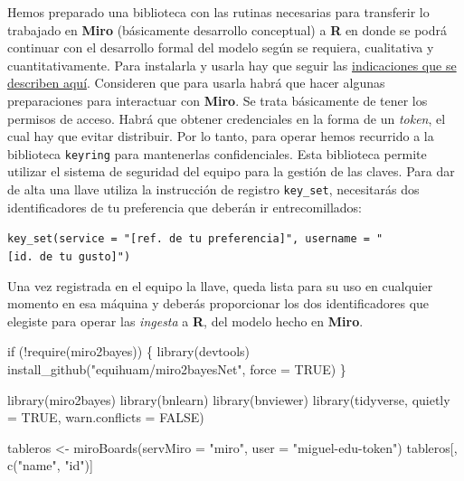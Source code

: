 \documentclass[
  letterpaper,
  DIV=11,
  numbers=noendperiod]{scrreprt}
\newenvironment{Shaded}{\begin{snugshade}}{\end{snugshade}}
\newcommand{\AttributeTok}[1]{\textcolor[rgb]{0.40,0.45,0.13}{#1}}
\newcommand{\ConstantTok}[1]{\textcolor[rgb]{0.56,0.35,0.01}{#1}}
\newcommand{\ControlFlowTok}[1]{\textcolor[rgb]{0.00,0.23,0.31}{#1}}
\newcommand{\FunctionTok}[1]{\textcolor[rgb]{0.28,0.35,0.67}{#1}}
\newcommand{\NormalTok}[1]{\textcolor[rgb]{0.00,0.23,0.31}{#1}}
\newcommand{\OtherTok}[1]{\textcolor[rgb]{0.00,0.23,0.31}{#1}}
\newcommand{\SpecialCharTok}[1]{\textcolor[rgb]{0.37,0.37,0.37}{#1}}
\newcommand{\StringTok}[1]{\textcolor[rgb]{0.13,0.47,0.30}{#1}}
\begin{document}
Hemos preparado una biblioteca con las rutinas necesarias para
transferir lo trabajado en \textbf{Miro} (básicamente desarrollo
conceptual) a \textbf{R} en donde se podrá continuar con el desarrollo
formal del modelo según se requiera, cualitativa y cuantitativamente.
Para instalarla y usarla hay que seguir las
\href{https://github.com/equihuam/miro2bayesNet}{indicaciones que se
describen aquí}. Consideren que para usarla habrá que hacer algunas
preparaciones para interactuar con \textbf{Miro}. Se trata básicamente
de tener los permisos de acceso. Habrá que obtener credenciales en la
forma de un \emph{token}, el cual hay que evitar distribuir. Por lo
tanto, para operar hemos recurrido a la biblioteca \texttt{keyring} para
mantenerlas confidenciales. Esta biblioteca permite utilizar el sistema
de seguridad del equipo para la gestión de las claves. Para dar de alta
una llave utiliza la instrucción de registro \texttt{key\_set},
necesitarás dos identificadores de tu preferencia que deberán ir
entrecomillados:

\texttt{key\_set(service\ =\ "{[}ref.\ de\ tu\ preferencia{]}",\ username\ =\ "{[}id.\ de\ tu\ gusto{]}")}

Una vez registrada en el equipo la llave, queda lista para su uso en
cualquier momento en esa máquina y deberás proporcionar los dos
identificadores que elegiste para operar las \emph{ingesta} a
\textbf{R}, del modelo hecho en \textbf{Miro}.

\begin{Shaded}
\begin{Highlighting}[]
\ControlFlowTok{if}\NormalTok{ (}\SpecialCharTok{!}\FunctionTok{require}\NormalTok{(miro2bayes))}
\NormalTok{\{}
  \FunctionTok{library}\NormalTok{(devtools)}
  \FunctionTok{install\_github}\NormalTok{(}\StringTok{"equihuam/miro2bayesNet"}\NormalTok{, }\AttributeTok{force =} \ConstantTok{TRUE}\NormalTok{)}
\NormalTok{\}}

\FunctionTok{library}\NormalTok{(miro2bayes)}
\FunctionTok{library}\NormalTok{(bnlearn)}
\FunctionTok{library}\NormalTok{(bnviewer)}
\FunctionTok{library}\NormalTok{(tidyverse, }\AttributeTok{quietly =} \ConstantTok{TRUE}\NormalTok{, }\AttributeTok{warn.conflicts =} \ConstantTok{FALSE}\NormalTok{)}

\NormalTok{tableros }\OtherTok{\textless{}{-}} \FunctionTok{miroBoards}\NormalTok{(}\AttributeTok{servMiro =} \StringTok{"miro"}\NormalTok{, }\AttributeTok{user =} \StringTok{"miguel{-}edu{-}token"}\NormalTok{)}
\NormalTok{tableros[, }\FunctionTok{c}\NormalTok{(}\StringTok{"name"}\NormalTok{, }\StringTok{"id"}\NormalTok{)]}
\end{Highlighting}
\end{Shaded}
\end{document}
